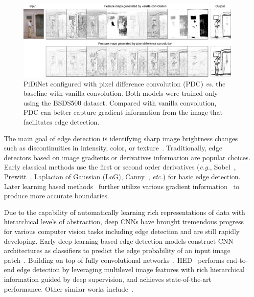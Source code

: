 \documentclass[10pt,twocolumn,letterpaper]{article}
\begin{document}
\begin{figure}[t!]
    \centering
    \includegraphics[width=0.98\linewidth]{images/figure_intro2.pdf}
    \caption{PiDiNet configured with pixel difference convolution (PDC) \emph{vs.} the baseline with vanilla convolution. Both models were trained only using the BSDS500 dataset. Compared with vanilla convolution, PDC can better capture gradient information from the image that facilitates edge detection.}
    \label{fig:figure2}
\end{figure}


The main goal of edge detection is identifying sharp image brightness changes such as discontinuities in intensity, color, or texture~\cite{torre1986edge}. Traditionally, edge detectors based on image gradients or derivatives information are popular choices. Early classical methods use the first or second order derivatives (\emph{e.g.}, Sobel~\cite{sobel19683x3}, Prewitt~\cite{prewitt1970object}, Laplacian of Gaussian (LoG), Canny~\cite{canny1986computational}, \emph{etc.}) for basic edge detection. Later learning based methods~\cite{hallman2015oef,dollar2014se} further utilize various gradient information~\cite{xiaofeng2012scg, martin2004pb,fowlkes2002learningpb,gupta2014seng} to produce more accurate boundaries.

Due to the capability of automatically learning rich representations of data with hierarchical levels of abstraction, deep CNNs have brought tremendous progress for various computer vision tasks including edge detection and are still rapidly developing. Early deep learning based edge detection models construct CNN architectures as classifiers to predict the edge probability of an input image patch~\cite{bertasius2015deepedge,shen2015deepcontour,bertasius2015hfl}. Building on top of fully convolutional networks~\cite{long2015fully}, HED~\cite{xie2017holistically} performs end-to-end edge detection by leveraging multilevel image features with rich hierarchical information guided by deep supervision, and achieves state-of-the-art performance. Other similar works include~\cite{yang2016cedn,kokkinos2015deepboundary,maninis2016cob,wang2017ced,xu2018amhnet,liu2019richer,deng2018lpcb,he2019bidirectional}.
\end{document}
